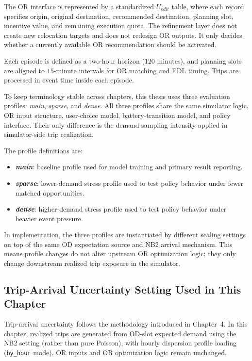 The OR interface is represented by a standardized \(U_{odit}\) table, where each record specifies origin, original destination, recommended destination, planning slot, incentive value, and remaining execution quota. The refinement layer does not create new relocation targets and does not redesign OR outputs. It only decides whether a currently available OR recommendation should be activated.

Each episode is defined as a two-hour horizon (\(120\) minutes), and planning slots are aligned to \(15\)-minute intervals for OR matching and EDL timing. Trips are processed in event time inside each episode.

To keep terminology stable across chapters, this thesis uses three evaluation profiles: \textit{main}, \textit{sparse}, and \textit{dense}.  
All three profiles share the same simulator logic, OR input structure, user-choice model, battery-transition model, and policy interface.  
Their only difference is the demand-sampling intensity applied in simulator-side trip realization.

The profile definitions are:
\begin{itemize}
\item \textbf{\textit{main}}: baseline profile used for model training and primary result reporting.
\item \textbf{\textit{sparse}}: lower-demand stress profile used to test policy behavior under fewer matched opportunities.
\item \textbf{\textit{dense}}: higher-demand stress profile used to test policy behavior under heavier event pressure.
\end{itemize}

In implementation, the three profiles are instantiated by different scaling settings on top of the same OD expectation source and NB2 arrival mechanism.  
This means profile changes do not alter upstream OR optimization logic; they only change downstream realized trip exposure in the simulator.


\subsection{Trip-Arrival Uncertainty Setting Used in This Chapter}

Trip-arrival uncertainty follows the methodology introduced in Chapter~4. In this chapter, realized trips are generated from OD-slot expected demand using the NB2 setting (rather than pure Poisson), with hourly dispersion profile loading (\texttt{by\_hour} mode). OR inputs and OR optimization logic remain unchanged.

